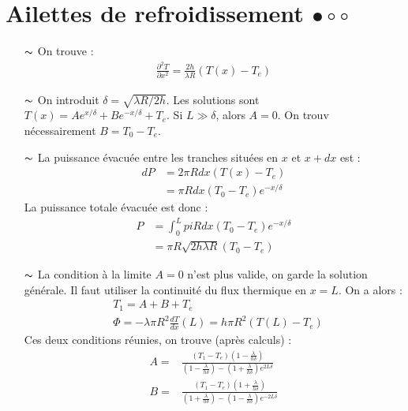 \documentclass{report}
\begin{document}
\newpage

\section*{Ailettes de refroidissement $\bullet\circ\circ$}

\begin{itemize}

	\item[$\thicksim$] On trouve :
	\begin{align*}
		\frac{\partial^2 T}{\partial x^2} = \frac{2h}{\lambda R}(T(x)-T_e)
	\end{align*}
	
	\item[$\thicksim$] On introduit $\delta=\sqrt{\lambda R/2h}$. Les solutions sont $T(x)=Ae^{x/\delta}+Be^{-x/\delta}+T_e$. Si $L\gg\delta$, alors $A=0$. On trouv nécessairement $B=T_0-T_e$.
	
	\item[$\thicksim$] La puissance évacuée entre les tranches situées en $x$ et $x+dx$ est :
	\begin{align*}
		dP&=2\pi Rdx(T(x)-T_e) \\
		&=\pi Rdx(T_0-T_e)e^{-x/\delta}
	\end{align*}
	La puissance totale évacuée est donc :
	\begin{align*}
		P&=\int_0^L pi Rdx(T_0-T_e)e^{-x/\delta} \\
		&=\pi R\sqrt{2h\lambda R}(T_0-T_e)
	\end{align*}
	
	\item[$\thicksim$] La condition à la limite $A=0$ n'est plus valide, on garde la solution générale. Il faut utiliser la continuité du flux thermique en $x=L$. On a alors :
	\begin{align*}
	& T_1=A+B+T_e \\
	& \Phi=-\lambda\pi R^2\frac{dT}{dx}(L)=h\pi R^2(T(L)-T_e)
	\end{align*}
Ces deux conditions réunies, on trouve (après calculs) :
\begin{align*}
	A=& \frac{(T_1-T_e)\left( 1-\frac{\lambda}{h\delta}\right) }{\left( 1-\frac{\lambda}{h\delta}\right) -\left( 1+\frac{\lambda}{h\delta}\right) e^{2L\delta}} \\
	B=&\frac{(T_1-T_e)\left( 1+\frac{\lambda}{h\delta}\right) }{\left( 1+\frac{\lambda}{h\delta}\right) -\left( 1-\frac{\lambda}{h\delta}\right) e^{-2L\delta}} 
\end{align*}

\end{itemize}
\end{document}
